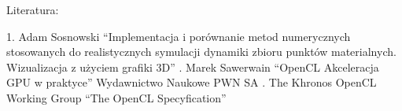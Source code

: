 \pagebreak
Literatura: \linebreak

1. Adam Sosnowski ``Implementacja i porównanie metod numerycznych stosowanych do realistycznych symulacji dynamiki zbioru punktów materialnych. Wizualizacja z użyciem grafiki 3D'' . Marek Sawerwain ``OpenCL Akceleracja GPU w praktyce'' Wydawnictwo Naukowe PWN SA . The Khronos OpenCL Working Group ``The OpenCL Specyfication'' \linebreak

